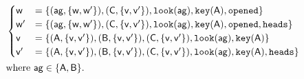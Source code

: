$\begin{aligned}
	&\begin{cases}
		\poss{w}&= \bra{
		  	(\agent{ag},\bra{\poss{w}, \poss{w^\prime}}),
		  	(\agent{c},\bra{\poss{v}, \poss{v^\prime}}),
		  	\looking{ag},
		  	\haskey{a},
		  	\opened%
	  	}\\
		\poss{w^\prime} &=\bra{
		  	(\agent{ag},\bra{\poss{w}, \poss{w^\prime}}),
		  	(\agent{c},\bra{\poss{v}, \poss{v^\prime}}),
		  	\looking{ag},
		  	\haskey{a}, 
		  	\opened, 
		  	\head%
	 	 }\\
		\poss{v} &= \bra{
			(\agent{a},\bra{\poss{v}, \poss{v^\prime}}),
			(\agent{b},\bra{\poss{v}, \poss{v^\prime}}),
			(\agent{c},\bra{\poss{v}, \poss{v^\prime}}),
			\looking{ag},
			\haskey{a}%
		}\\
		\poss{v}^\prime &= \bra{
			(\agent{a},\bra{\poss{v}, \poss{v^\prime}}),
			(\agent{b},\bra{\poss{v}, \poss{v^\prime}}),
			(\agent{c},\bra{\poss{v}, \poss{v^\prime}}),
			\looking{ag},
			\haskey{a},
			\head%
		}\\
	\end{cases}\\
	&\text{where }\agent{ag} \in \bra{\agent{a}, \agent{b}}.
\end{aligned}$


